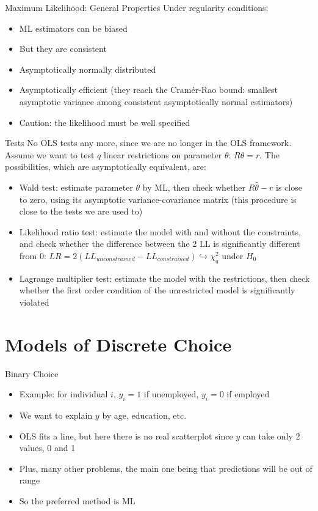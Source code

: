 \documentclass[aspectratio=169]{beamer}
\begin{document}
\begin{frame}{Maximum Likelihood: General Properties}
Under regularity conditions:
\begin{itemize}
    \item ML estimators can be biased
    \item But they are consistent
    \item Asymptotically normally distributed
    \item Asymptotically efficient (they reach the Cramér-Rao bound: smallest asymptotic variance among consistent asymptotically normal estimators)
    \item Caution: the likelihood must be well specified
\end{itemize}
\end{frame}

\begin{frame}{Tests}
No OLS tests any more, since we are no longer in the OLS framework. Assume we want to test $q$ linear restrictions on parameter $\theta$: $R\theta = r$. The possibilities, which are asymptotically equivalent, are:

\begin{itemize}
    \item Wald test: estimate parameter $\theta$ by ML, then check whether $R\hat{\theta} - r$ is close to zero, using its asymptotic variance-covariance matrix (this procedure is close to the tests we are used to)
    \item Likelihood ratio test: estimate the model with and without the constraints, and check whether the difference between the 2 LL is significantly different from 0: $LR = 2(LL_{unconstrained} - LL_{constrained}) \hookrightarrow \chi^2_q$ under $H_0$
    \item Lagrange multiplier test: estimate the model with the restrictions, then check whether the first order condition of the unrestricted model is significantly violated
\end{itemize}
\end{frame}

\section{Models of Discrete Choice}

\begin{frame}{Binary Choice}
\begin{itemize}
    \item Example: for individual $i$, $y_i = 1$ if unemployed, $y_i = 0$ if employed
    \item We want to explain $y$ by age, education, etc.
    \item OLS fits a line, but here there is no real scatterplot since $y$ can take only 2 values, 0 and 1
    \item Plus, many other problems, the main one being that predictions will be out of range
    \item So the preferred method is ML
\end{itemize}
\end{frame}
\end{document}
